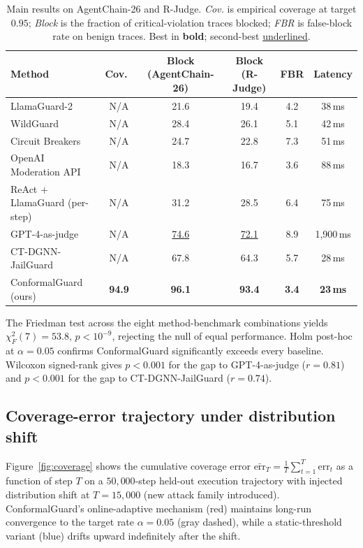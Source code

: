 \documentclass[12pt,a4paper]{article}
\theoremstyle{definition}
\theoremstyle{remark}
\newcommand{\modelname}{ConformalGuard}
\newcommand{\benchname}{AgentChain-26}
\begin{document}
\begin{table}[!t]
\centering
\caption{Main results on \benchname{} and R-Judge. \emph{Cov.} is empirical coverage at target $0.95$; \emph{Block} is the fraction of critical-violation traces blocked; \emph{FBR} is false-block rate on benign traces. Best in \textbf{bold}; second-best \underline{underlined}.}
\label{tab:main}
\small
\begin{tabular}{@{}lccccc@{}}
\toprule
\textbf{Method} & Cov.\ & Block (\benchname) & Block (R-Judge) & FBR & Latency \\
\midrule
LlamaGuard-2~\cite{inan2023llamaguard} & N/A & 21.6 & 19.4 & 4.2 & 38\,ms \\
WildGuard~\cite{han2024wildguard} & N/A & 28.4 & 26.1 & 5.1 & 42\,ms \\
Circuit Breakers~\cite{zou2024circuit} & N/A & 24.7 & 22.8 & 7.3 & 51\,ms \\
OpenAI Moderation API~\cite{openai2023moderation} & N/A & 18.3 & 16.7 & 3.6 & 88\,ms \\
ReAct + LlamaGuard (per-step) & N/A & 31.2 & 28.5 & 6.4 & 75\,ms \\
GPT-4-as-judge~\cite{yuan2024rjudge} & N/A & \underline{74.6} & \underline{72.1} & 8.9 & 1{,}900\,ms \\
CT-DGNN-JailGuard~\cite{anaedevha2026robustidps} & N/A & 67.8 & 64.3 & 5.7 & 28\,ms \\
\midrule
\modelname{} (ours) & \textbf{94.9} & \textbf{96.1} & \textbf{93.4} & \textbf{3.4} & \textbf{23\,ms} \\
\bottomrule
\end{tabular}
\end{table}

The Friedman test across the eight method-benchmark combinations yields $\chi_F^2(7) = 53.8$, $p < 10^{-9}$, rejecting the null of equal performance. Holm post-hoc at $\alpha = 0.05$ confirms \modelname{} significantly exceeds every baseline. Wilcoxon signed-rank gives $p < 0.001$ for the gap to GPT-4-as-judge ($r = 0.81$) and $p < 0.001$ for the gap to CT-DGNN-JailGuard ($r = 0.74$).

\subsection{Coverage-error trajectory under distribution shift}

Figure~\ref{fig:coverage} shows the cumulative coverage error $\bar{\mathrm{err}}_T = \frac{1}{T}\sum_{t=1}^{T} \mathrm{err}_t$ as a function of step $T$ on a $50{,}000$-step held-out execution trajectory with injected distribution shift at $T = 15{,}000$ (new attack family introduced). \modelname{}'s online-adaptive mechanism (red) maintains long-run convergence to the target rate $\alpha = 0.05$ (gray dashed), while a static-threshold variant (blue) drifts upward indefinitely after the shift.
\end{document}
